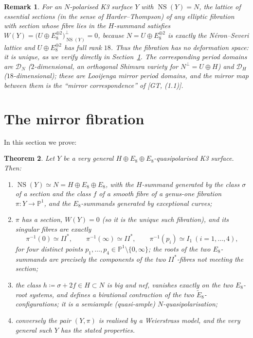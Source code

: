 \documentclass[11pt]{article}
\newtheorem{theorem}{Theorem}[section]
\newtheorem{remark}[theorem]{Remark}
\newcommand{\PP}{\mathbb{P}}
\DeclareMathOperator{\NS}{NS}
\begin{document}
\begin{remark}\label{rem:W}
For an $N$-polarised K3 surface $Y$ with $\NS(Y)=N$, the lattice of essential
sections (in the sense of Harder--Thompson) of any elliptic fibration with
section whose fibre lies in the $H$-summand satisfies
$W(Y)=\bigl(U\oplus E_8^{\oplus 2}\bigr)^{\perp}_{\NS(Y)}=0$,
because $N=U\oplus E_8^{\oplus2}$ is exactly the N\'eron--Severi lattice and
$U\oplus E_8^{\oplus2}$ has full rank $18$. Thus the fibration has no
deformation space: it is unique, as we verify directly in
Section~\ref{sec:fibration}. The corresponding period domains are
$\mathcal D_N$ ($2$-dimensional, an orthogonal Shimura variety for
$N^{\perp}=U\oplus H$) and $\mathcal D_H$ ($18$-dimensional); these are
Looijenga mirror period domains, and the mirror map between them is the
``mirror correspondence'' of [GT, (1.1)].
\end{remark}

\section{The mirror fibration}\label{sec:fibration}

In this section we prove:

\begin{theorem}\label{thm:fibration}
Let $Y$ be a very general $H\oplus E_8\oplus E_8$-quasipolarised K3 surface.
Then:
\begin{enumerate}[label=(\alph*),leftmargin=2em]
\item $\NS(Y)\simeq N=H\oplus E_8\oplus E_8$, with the $H$-summand generated
by the class $\sigma$ of a section and the class $f$ of a smooth fibre of a
genus-one fibration $\pi\colon Y\to\PP^1$, and the $E_8$-summands generated
by exceptional curves;
\item $\pi$ has a section, $W(Y)=0$ (so it is the unique such fibration), and
its singular fibres are exactly
\[
\pi^{-1}(0)\simeq II^*,\qquad
\pi^{-1}(\infty)\simeq II^*,\qquad
\pi^{-1}(p_i)\simeq I_1\ (i=1,\dots,4),
\]
for four distinct points $p_1,\dots,p_4\in\PP^1\setminus\{0,\infty\}$;
the roots of the two $E_8$-summands are precisely the components of the two
$II^*$-fibres not meeting the section;
\item the class $h\coloneqq\sigma+2f\in H\subset N$ is big and nef, vanishes
exactly on the two $E_8$-root systems, and defines a birational contraction
of the two $\tilde E_8$-configurations; it is a semiample (quasi-ample)
$N$-quasipolarisation;
\item conversely the pair $(Y,\pi)$ is realised by a Weierstrass model, and
the very general such $Y$ has the stated properties.
\end{enumerate}
\end{theorem}
\end{document}
